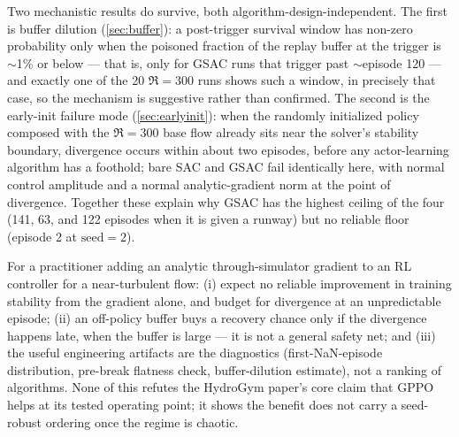 Two mechanistic results do survive, both algorithm-design-independent. The
first is buffer dilution
(\cref{sec:buffer}): a post-trigger survival window has non-zero probability
only when the poisoned fraction of the replay buffer at the trigger is
$\sim$1\% or below --- that is, only for GSAC runs that trigger past
$\sim$episode 120 --- and exactly one of the 20 $\Re=300$ runs shows such a
window, in precisely that case, so the mechanism is suggestive rather than
confirmed. The second is the early-init failure mode (\cref{sec:earlyinit}):
when the randomly initialized policy composed with the $\Re=300$ base flow
already sits near the solver's stability boundary, divergence occurs within
about two episodes, before any actor-learning algorithm has a foothold; bare
SAC and GSAC fail identically here, with normal control amplitude and a
normal analytic-gradient norm at the point of divergence. Together these
explain why GSAC has the highest ceiling of the four (141, 63, and 122
episodes when it is given a runway) but no reliable floor (episode 2 at
$\text{seed}=2$).

For a practitioner adding an analytic through-simulator gradient to an RL
controller for a near-turbulent flow: (i) expect no reliable improvement in
training stability from the gradient alone, and budget for divergence at an
unpredictable episode; (ii) an off-policy buffer buys a recovery chance only
if the divergence happens late, when the buffer is large --- it is not a
general safety net; and (iii) the useful engineering artifacts are the
diagnostics (first-NaN-episode distribution, pre-break flatness check,
buffer-dilution estimate), not a ranking of algorithms. None of this refutes
the HydroGym paper's core claim that GPPO helps at its tested operating
point; it shows the benefit does not carry a seed-robust ordering once the
regime is chaotic.

